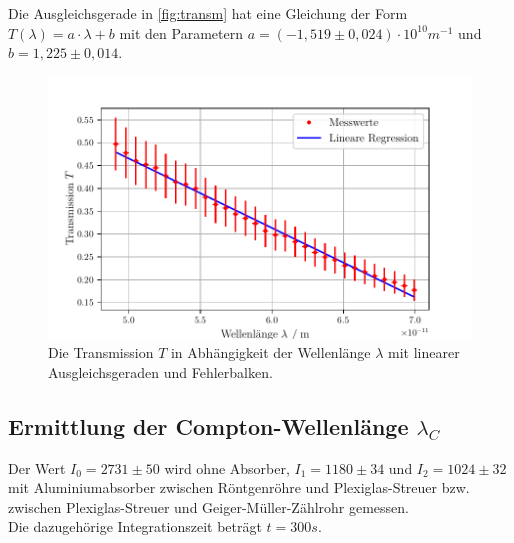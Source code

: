 Die Ausgleichsgerade in \autoref{fig:transm} hat eine Gleichung der Form $T(\lambda) = a \cdot \lambda + b$ mit 
den Parametern $a = (-1,519 \pm 0,024)\cdot 10^{10} m^{-1}$ und $b = 1,225 \pm 0,014$.

\begin{figure}
  \centering
  \includegraphics{build/transmission2.pdf}
  \caption{Die Transmission $T$ in Abhängigkeit der Wellenlänge $\lambda$ mit linearer Ausgleichsgeraden und Fehlerbalken.}
  \label{fig:transm2}
\end{figure}



\subsection{Ermittlung der Compton-Wellenlänge $\lambda_{C}$}
\label{subsec:comptonwellenl}

Der Wert $I_0 = 2731 \pm 50$ wird ohne Absorber, $I_1 = 1180 \pm 34$ und $I_2 = 1024 \pm 32$ mit Aluminiumabsorber zwischen Röntgenröhre
und Plexiglas-Streuer bzw. zwischen Plexiglas-Streuer und Geiger-Müller-Zählrohr gemessen.\\
Die dazugehörige Integrationszeit beträgt $t = 300s$.\\
